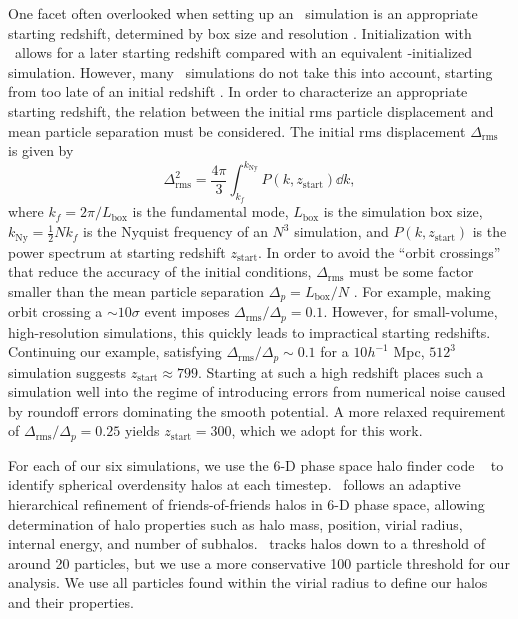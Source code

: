 One facet often overlooked when setting up an \nbody\ simulation is an appropriate starting redshift, determined by box size and resolution \citep{2007ApJ...671.1160L}.  Initialization with \lpt\ allows for a later starting redshift compared with an equivalent \za-initialized simulation.  However, many \za\ simulations do not take this into account, starting from too late of an initial redshift \citep{2006MNRAS.373..369C, 2010MNRAS.403.1859J}.  In order to characterize an appropriate starting redshift, the relation between the initial rms particle displacement and mean particle separation must be considered.  The initial rms displacement $\Delta_{\mathrm{rms}}$ is given by
\begin{equation}
	\Delta_{\mathrm{rms}}^{2} = \frac{4 \pi}{3} \int_{k_{f}}^{k_{\mathrm{Ny}}} P(k, z_{\mathrm{start}}) \dd k,
\end{equation}
where $k_{f} = 2 \pi / L_{\mathrm{box}}$ is the fundamental mode, $L_{\mathrm{box}}$ is the simulation box size, $k_{\mathrm{Ny}} = \frac{1}{2} N k_{f}$ is the Nyquist frequency of an $N^{3}$ simulation, and $P(k, z_{\mathrm{start}})$ is the power spectrum at starting redshift $z_{\mathrm{start}}$.  In order to avoid the ``orbit crossings'' that reduce the accuracy of the initial conditions, $\Delta_{\mathrm{rms}}$ must be some factor smaller than the mean particle separation $\Delta_{p} = L_{\mathrm{box}} / N$ \citep{2012ApJ...761L...8H}.  For example, making orbit crossing a $\sim 10 \sigma$ event imposes $\Delta_{\mathrm{rms}} / \Delta_{p} = 0.1$.  However, for small-volume, high-resolution simulations, this quickly leads to impractical starting redshifts.  Continuing our example, satisfying $\Delta_{\mathrm{rms}} / \Delta_{p} \sim 0.1$ for a $10 h^{-1}$ Mpc, $512^{3}$ simulation suggests $z_{\mathrm{start}} \approx 799$.  Starting at such a high redshift places such a simulation well into the regime of introducing errors from numerical noise caused by roundoff errors dominating the smooth potential.  A more relaxed requirement of $\Delta_{\mathrm{rms}} / \Delta_{p} = 0.25$ yields $z_{\mathrm{start}} = 300$, which we adopt for this work.






For each of our six simulations, we use the 6-D phase space halo finder code \rockstar\ \citep{2013ApJ...762..109B} to identify spherical overdensity halos at each timestep.  \rockstar\ follows an adaptive hierarchical refinement of friends-of-friends halos in 6-D phase space, allowing determination of halo properties such as halo mass, position, virial radius, internal energy, and number of subhalos.  \rockstar\ tracks halos down to a threshold of around 20 particles, but we use a more conservative 100 particle threshold for our analysis.  We use all particles found within the virial radius to define our halos and their properties.




